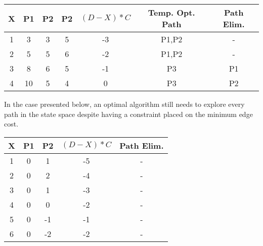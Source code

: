 \documentclass[12pt]{article}
\begin{document}
\begin{center}
 \begin{tabular}{||c c c c c c c||} 
 \hline
 X & P1 & P2 & P2 & $(D-X)*C$ & Temp. Opt. Path & Path Elim.\\ [0.5ex] 
 \hline\hline
 1 & 3 & 3 & 5 & -3 & P1,P2 & -\\ 
 \hline
 2 & 5 & 5 & 6 & -2 & P1,P2 & -\\
 \hline
 3 & 8 & 6 & 5 & -1 & P3 & P1\\
 \hline
 4 & 10 & 5 & {\color{blue}4} & {\color{red}0} & P3 & P2\\[1ex] 
 \hline
\end{tabular}
\end{center}

In the case presented below, an optimal algorithm still needs to explore every path in the state space despite having a constraint placed on the minimum edge cost.

    
\begin{center}
\end{center}

\begin{center}
 \begin{tabular}{||c c c c c||} 
 \hline
 X & P1 & P2 & $(D-X)*C$ & Path Elim.\\ [0.5ex] 
 \hline\hline
 1 & 0 & 1 & -5 & - \\ 
 \hline
 2 & 0 & 2 & -4 & -\\
 \hline
 3 & 0 & 1 & -3 & -\\
 \hline
 4 & 0 & 0 & -2 & -\\
 \hline
  5 & 0 & -1 & -1 & -\\
 \hline
 6 & 0 & -2 & -2 & - \\ [1ex] 
 \hline
\end{tabular}
\end{center}
\end{document}
